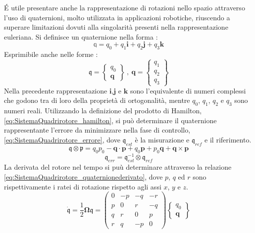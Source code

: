 \'E utile presentare anche la rappresentazione di rotazioni nello spazio attraverso l'uso di quaternioni, molto utilizzata in applicazioni robotiche, riuscendo a superare limitazioni dovuti alla singolarità presenti nella rappresentazione euleriana.
Si definisce un quaternione nella forma :
\[ 
	\mathbb{q} = q_0 + q_1 \mathbf{i} + q_2 \mathbf{j} + q_3 \mathbf{k}
\]
Esprimibile anche nelle forme :
\[ 
	\mathfrak{q} = \begin{Bmatrix}
		q_0\\
		\mathbf{q}
	\end{Bmatrix} \ , \ \mathbf{q} = \begin{Bmatrix}
		q_1\\
		q_2\\
		q_3
	\end{Bmatrix}
\]
Nella precedente rappresentazione $\mathbf{i}$,$\mathbf{j}$ e $\mathbf{k}$ sono l'equivalente di numeri complessi che godono tra di loro della proprietà di ortogonalità, mentre $q_0$, $q_1$, $q_2$ e $q_3$ sono numeri reali. Utilizzando la definizione del prodotto di Hamilton, \ref{eq:SistemaQuadrirotore_hamilton}, si può determinare il quaternione rappresentante l'errore da minimizzare nella fase di controllo, \ref{eq:SistemaQuadrirotore_errore}, dove $\mathfrak{q}_{est}$ è la misurazione e $ \mathfrak{q}_{ref}$ e il riferimento.
\begin{equation}\label{eq:SistemaQuadrirotore_hamilton}
	\mathfrak{q} \otimes \mathfrak{p} = q_0 p_0 - \mathbf{q} \cdot \mathbf{p} + q_0 \mathbf{p} + p_0 \mathbf{q} + \mathbf{q} \times \mathbf{p}
\end{equation}
\begin{equation}\label{eq:SistemaQuadrirotore_errore}
	\mathfrak{q}_{err} = \mathfrak{q}_{est}^{-1} \otimes \mathfrak{q}_{ref}
\end{equation}
La derivata del rotore nel tempo si puù determinare attraverso la relazione \ref{eq:SistemaQuadrirotore_quaternionederivato}, dove $p$, $q$ ed $r$ sono rispettivamente i ratei di rotazione rispetto agli assi $x$, $y$ e $z$.
\begin{equation}\label{eq:SistemaQuadrirotore_quaternionederivato}
\mathfrak{\dot{q}} = \frac{1}{2} \mathbf{\Omega} \mathfrak{q} =
	\begin{pmatrix}
		0 & -p & -q & -r \\
		p &  0 &  r & -q \\
		q &  r &  0 &  p \\
		r &  q & -p &  0 
	\end{pmatrix}
	\begin{Bmatrix}
		q_0 \\
		\mathbf{q}
	\end{Bmatrix}
\end{equation}

